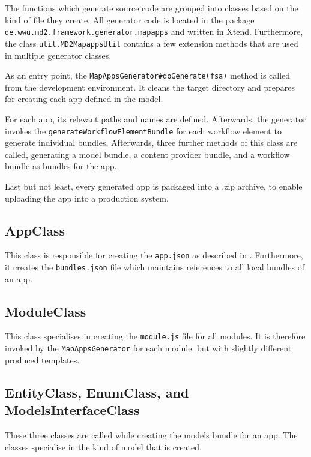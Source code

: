 
\label{sec:dev-generator-mapapps}

The functions which generate \mapapps source code are grouped into classes based on the kind of file they create. All \mapapps generator code is located in the package \lstinline[language=Simple]|de.wwu.md2.framework.generator.mapapps| and written in Xtend. Furthermore, the class \lstinline|util.MD2MapappsUtil| contains a few extension methods that are used in multiple generator classes.

As an entry point, the \lstinline[language=Simple]|MapAppsGenerator#doGenerate(fsa)| method is called from the development environment. It cleans the target directory and prepares for creating  each app defined in the model.

For each app, its relevant paths and names are defined. Afterwards, the generator invokes the \lstinline|generate|\lstinline|WorkflowElementBundle| for each workflow element to generate individual bundles. Afterwards, three further methods of this class are called, generating a model bundle, a content provider bundle, and a workflow bundle as bundles for the app.


Last but not least, every generated app is packaged into a .zip archive, to enable uploading the app into a production \mapapps system.

\subsection{AppClass}

This class is responsible for creating the \lstinline[language=Simple]|app.json| as described in . Furthermore, it creates the \lstinline[language=Simple]|bundles.json| file which maintains references to all local bundles of an app.

\subsection{ModuleClass}

This class specialises in creating the \lstinline|module.js| file for all modules. It is therefore invoked by the \lstinline|MapApps|\lstinline|Generator| for each module, but with slightly different produced templates.

\subsection{EntityClass, EnumClass, and ModelsInterfaceClass}
These three classes are called while creating the models bundle for an app. 
The classes specialise in the kind of model that is created.


